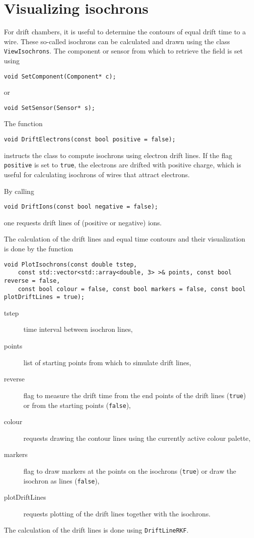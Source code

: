\section{Visualizing isochrons}

For drift chambers, it is useful to determine the contours of equal drift time to a wire.
These so-called isochrons can be calculated and drawn 
using the class \texttt{ViewIsochrons}.
The component or sensor from which to retrieve the field is set using
\begin{lstlisting}
void SetComponent(Component* c);
\end{lstlisting}
or
\begin{lstlisting}
void SetSensor(Sensor* s);
\end{lstlisting}

The function
\begin{lstlisting}
void DriftElectrons(const bool positive = false);
\end{lstlisting}
instructs the class to compute isochrons using electron drift lines.
If the flag \texttt{positive} is set to \texttt{true}, the electrons 
are drifted with positive charge,
which is useful for calculating isochrons of wires that attract electrons.

By calling
\begin{lstlisting}
void DriftIons(const bool negative = false);
\end{lstlisting}
one requests drift lines of (positive or negative) ions.

The calculation of the drift lines and equal time contours and their visualization is 
done by the function 
\begin{lstlisting}
void PlotIsochrons(const double tstep,
    const std::vector<std::array<double, 3> >& points, const bool reverse = false,
    const bool colour = false, const bool markers = false, const bool plotDriftLines = true);
\end{lstlisting}
\begin{description}
  \item[tstep] time interval between isochron lines,
  \item[points] list of starting points from which to simulate drift lines,
  \item[reverse] flag to measure the drift time from the end points of the drift lines (\texttt{true}) or from the starting points (\texttt{false}),
  \item[colour] requests drawing the contour lines using the currently active colour palette,
  \item[markers] flag to draw markers at the points on the isochrons (\texttt{true}) or draw the isochron as lines (\texttt{false}), 
  \item[plotDriftLines] requests plotting of the drift lines together with the isochrons. 
\end{description} 
The calculation of the drift lines is done using \texttt{DriftLineRKF}.

